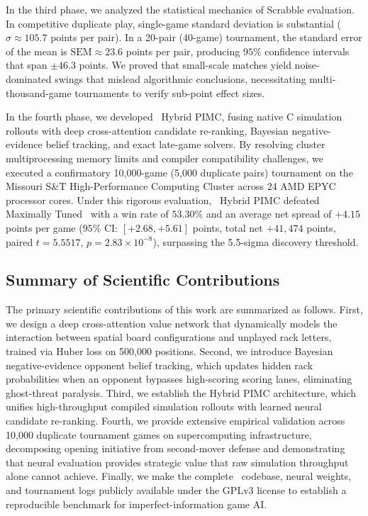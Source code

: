 In the third phase, we analyzed the statistical mechanics of Scrabble evaluation. In competitive duplicate play, single-game standard deviation is substantial ($\sigma \approx 105.7$ points per pair). In a 20-pair (40-game) tournament, the standard error of the mean is $\text{SEM} \approx 23.6$ points per pair, producing $95\%$ confidence intervals that span $\pm 46.3$ points. We proved that small-scale matches yield noise-dominated swings that mislead algorithmic conclusions, necessitating multi-thousand-game tournaments to verify sub-point effect sizes.

In the fourth phase, we developed \algo\ Hybrid PIMC, fusing native C simulation rollouts with deep cross-attention candidate re-ranking, Bayesian negative-evidence belief tracking, and exact late-game solvers. By resolving cluster multiprocessing memory limits and compiler compatibility challenges, we executed a confirmatory 10,000-game (5,000 duplicate pairs) tournament on the Missouri S\&T High-Performance Computing Cluster across 24 AMD EPYC processor cores. Under this rigorous evaluation, \algo\ Hybrid PIMC defeated Maximally Tuned \magpie\ with a win rate of $53.30\%$ and an average net spread of $+4.15$ points per game ($95\%$ CI: $[+2.68, +5.61]$ points, total net $+41,474$ points, paired $t = 5.5517$, $p = 2.83 \times 10^{-8}$), surpassing the 5.5-sigma discovery threshold.

\subsection{Summary of Scientific Contributions}

The primary scientific contributions of this work are summarized as follows. First, we design a deep cross-attention value network that dynamically models the interaction between spatial board configurations and unplayed rack letters, trained via Huber loss on 500,000 positions. Second, we introduce Bayesian negative-evidence opponent belief tracking, which updates hidden rack probabilities when an opponent bypasses high-scoring scoring lanes, eliminating ghost-threat paralysis. Third, we establish the Hybrid PIMC architecture, which unifies high-throughput compiled simulation rollouts with learned neural candidate re-ranking. Fourth, we provide extensive empirical validation across 10,000 duplicate tournament games on supercomputing infrastructure, decomposing opening initiative from second-mover defense and demonstrating that neural evaluation provides strategic value that raw simulation throughput alone cannot achieve. Finally, we make the complete \algo\ codebase, neural weights, and tournament logs publicly available under the GPLv3 license to establish a reproducible benchmark for imperfect-information game AI.
